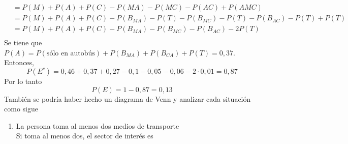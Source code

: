 \begin{enumerate}
\begin{align*}
                &=P(M)+P(A)+P(C)-P(MA)-P(MC)-P(AC)+P(AMC)\\
                &=P(M)+P(A)+P(C)-P(B_{MA})-P(T)-P(B_{MC})-P(T)-P(B_{AC})-P(T)+P(T)\\
                &=P(M)+P(A)+P(C)-P(B_{MA})-P(B_{MC})-P(B_{AC})-2P(T)\\
            \end{align*}
            Se tiene que $P(A)=P(\text{sólo en autobús})+P(B_{MA})+P(B_{CA})+P(T)=0,37$. Entonces,
            \[P(E^c)=0,46+0,37+0,27-0,1-0,05-0,06-2\cdot0,01=0,87\]
            Por lo tanto \[P(E)=1-0,87=0,13\]
            También se podría haber hecho un diagrama de Venn y analizar cada situación como sigue
            \begin{enumerate}
                \item La persona toma al menos dos medios de transporte\e\\
                    Si toma al menos dos, el sector de interés es
                    \begin{center}
\end{center}
\end{enumerate}
\end{enumerate}
